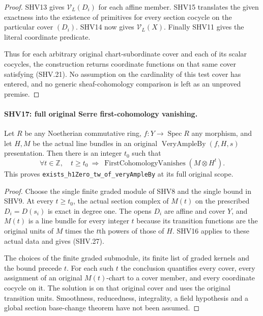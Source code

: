 \begin{proof}
SHV13 gives $\mathcal V_L(D_i)$ for each affine member.
SHV15 translates the given exactness into the existence of
primitives for every section cocycle on the particular
cover $(D_i)$.  SHV14 now gives $\mathcal V_L(X)$.
Finally SHV11 gives the literal coordinate predicate.

Thus for each arbitrary original chart-subordinate cover
and each of its scalar cocycles, the construction returns
coordinate functions on that same cover satisfying (SHV.21).
No assumption on the cardinality of this test cover has
entered, and no generic sheaf-cohomology comparison is left
as an unproved premise.
\end{proof}

\paragraph{SHV17: full original Serre first-cohomology vanishing.}
\label{claim:SHV17}
Let $R$ be any Noetherian commutative ring,
$f:Y\to\operatorname{Spec}R$ any morphism, and let
$H,M$ be the actual line bundles in an original
$\operatorname{VeryAmpleBy}(f,H,s)$ presentation.
Then there is an integer $t_0$ such that
\[
 \forall t\in\mathbb Z,\quad t\ge t_0
   \ \Longrightarrow\
       \operatorname{FirstCohomologyVanishes}(M\otimes H^t).
                                                        \tag{SHV.27}
\]
This proves \texttt{exists\_\allowbreak h1Zero\_\allowbreak tw\_\allowbreak of\_\allowbreak veryAmpleBy}
at its full original scope.

\begin{proof}
Choose the single finite graded module of SHV8 and the single
bound in SHV9.  At every $t\ge t_0$, the actual section complex
of $M(t)$ on the prescribed $D_i=D(s_i)$ is exact in degree one.
The opens $D_i$ are affine and cover $Y$, and $M(t)$ is a line
bundle for every integer $t$ because its transition functions
are the original units of $M$ times the $t$th powers of those
of $H$.  SHV16 applies to these actual data and gives (SHV.27).

The choices of the finite graded submodule, its finite list of
graded kernels and the bound precede $t$.  For each such $t$
the conclusion quantifies every cover, every assignment of an
original $M(t)$-chart to a cover member, and every coordinate
cocycle on it.  The solution is on that original cover and
uses the original transition units.  Smoothness, reducedness,
integrality, a field hypothesis and a global section
base-change theorem have not been assumed.
\end{proof}

